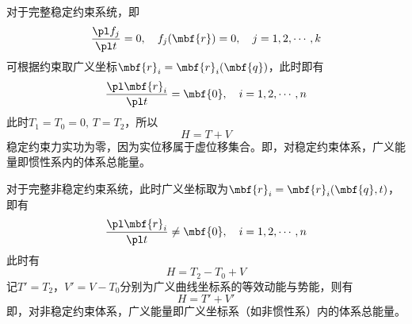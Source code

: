 对于完整稳定约束系统，即
\begin{equation*}
	\frac{\pl f_j}{\pl t} = 0,\quad f_j(\mbf{r}) = 0,\quad j = 1,2,\cdots,k
\end{equation*}
可根据约束取广义坐标$\mbf{r}_i = \mbf{r}_i(\mbf{q})$，此时即有
\begin{equation*}
	\frac{\pl \mbf{r}_i}{\pl t} = \mbf{0},\quad i = 1,2,\cdots,n
\end{equation*}
此时$T_1 = T_0 = 0,\, T = T_2$，所以
\begin{equation*}
	H = T+V
\end{equation*}
稳定约束力实功为零，因为实位移属于虚位移集合。即，对稳定约束体系，广义能量即惯性系内的体系总能量。

对于完整非稳定约束系统，此时广义坐标取为$\mbf{r}_i = \mbf{r}_i(\mbf{q},t)$，即有
\begin{equation*}
	\frac{\pl \mbf{r}_i}{\pl t} \neq \mbf{0},\quad i = 1,2,\cdots,n
\end{equation*}
此时有
\begin{equation*}
	H = T_2-T_0+V
\end{equation*}
记$T' = T_2$，$V'=V-T_0$分别为广义曲线坐标系的等效动能与势能，则有
\begin{equation*}
	H = T'+V'
\end{equation*}
即，对非稳定约束体系，广义能量即广义坐标系（如非惯性系）内的体系总能量。

